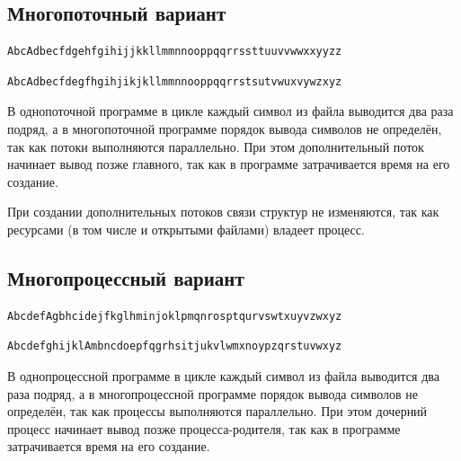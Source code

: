 \documentclass[a4paper,14pt]{extarticle}
\begin{document}
\subsection{Многопоточный вариант}



\begin{lstlisting}[caption={\text{Вывод программы}}]
AbcAdbecfdgehfgihijjkkllmmnnooppqqrrssttuuvvwwxxyyzz
\end{lstlisting}



\begin{lstlisting}[caption={\text{Вывод программы}}]
AbcAdbecfdegfhgihjikjkllmmnnooppqqrrstsutvwuxvywzxyz
\end{lstlisting}

В однопоточной программе в цикле каждый символ из файла выводится два раза подряд, а в многопоточной программе порядок вывода символов не определён, так как потоки выполняются параллельно. При этом дополнительный поток начинает вывод позже главного, так как в программе затрачивается время на его создание.

При создании дополнительных потоков связи структур не изменяются, так как ресурсами (в том числе и открытыми файлами) владеет процесс.

\subsection{Многопроцессный вариант}



\begin{lstlisting}[caption={\text{Вывод программы}}]
AbcdefAgbhcidejfkglhminjoklpmqnrosptqurvswtxuyvzwxyz
\end{lstlisting}



\begin{lstlisting}[caption={\text{Вывод программы}}]
AbcdefghijklAmbncdoepfqgrhsitjukvlwmxnoypzqrstuvwxyz
\end{lstlisting}

В однопроцессной программе в цикле каждый символ из файла выводится два раза подряд, а в многопроцессной программе порядок вывода символов не определён, так как процессы выполняются параллельно. При этом дочерний процесс начинает вывод позже процесса-родителя, так как в программе затрачивается время на его создание.
\end{document}
